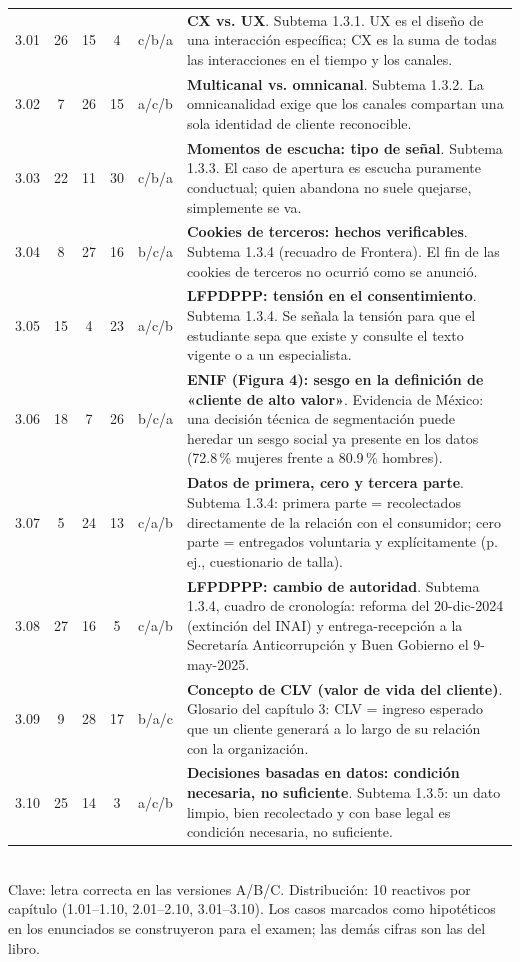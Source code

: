 \documentclass[10pt,letterpaper]{article}
\begin{document}
{\begin{tabularx}{\textwidth}{@{}l c c c c X@{}}
3.01 & 26 & 15 & 4 & c/b/a & \textbf{CX vs. UX}. Subtema 1.3.1. UX es el diseño de una interacción específica; CX es la suma de todas las interacciones en el tiempo y los canales.\\
3.02 & 7 & 26 & 15 & a/c/b & \textbf{Multicanal vs. omnicanal}. Subtema 1.3.2. La omnicanalidad exige que los canales compartan una sola identidad de cliente reconocible.\\
3.03 & 22 & 11 & 30 & c/b/a & \textbf{Momentos de escucha: tipo de señal}. Subtema 1.3.3. El caso de apertura es escucha puramente conductual; quien abandona no suele quejarse, simplemente se va.\\
3.04 & 8 & 27 & 16 & b/c/a & \textbf{Cookies de terceros: hechos verificables}. Subtema 1.3.4 (recuadro de Frontera). El fin de las cookies de terceros no ocurrió como se anunció.\\
3.05 & 15 & 4 & 23 & a/c/b & \textbf{LFPDPPP: tensión en el consentimiento}. Subtema 1.3.4. Se señala la tensión para que el estudiante sepa que existe y consulte el texto vigente o a un especialista.\\
3.06 & 18 & 7 & 26 & b/c/a & \textbf{ENIF (Figura 4): sesgo en la definición de «cliente de alto valor»}. Evidencia de México: una decisión técnica de segmentación puede heredar un sesgo social ya presente en los datos (72.8\,\% mujeres frente a 80.9\,\% hombres).\\
3.07 & 5 & 24 & 13 & c/a/b & \textbf{Datos de primera, cero y tercera parte}. Subtema 1.3.4: primera parte = recolectados directamente de la relación con el consumidor; cero parte = entregados voluntaria y explícitamente (p. ej., cuestionario de talla).\\
3.08 & 27 & 16 & 5 & c/a/b & \textbf{LFPDPPP: cambio de autoridad}. Subtema 1.3.4, cuadro de cronología: reforma del 20-dic-2024 (extinción del INAI) y entrega-recepción a la Secretaría Anticorrupción y Buen Gobierno el 9-may-2025.\\
3.09 & 9 & 28 & 17 & b/a/c & \textbf{Concepto de CLV (valor de vida del cliente)}. Glosario del capítulo 3: CLV = ingreso esperado que un cliente generará a lo largo de su relación con la organización.\\
3.10 & 25 & 14 & 3 & a/c/b & \textbf{Decisiones basadas en datos: condición necesaria, no suficiente}. Subtema 1.3.5: un dato limpio, bien recolectado y con base legal es condición necesaria, no suficiente.\\
\bottomrule\end{tabularx}}
\\[3pt]{\scriptsize Clave: letra correcta en las versiones A/B/C. Distribución: 10 reactivos por capítulo (1.01--1.10, 2.01--2.10, 3.01--3.10). Los casos marcados como hipotéticos en los enunciados se construyeron para el examen; las demás cifras son las del libro.}
\end{document}
